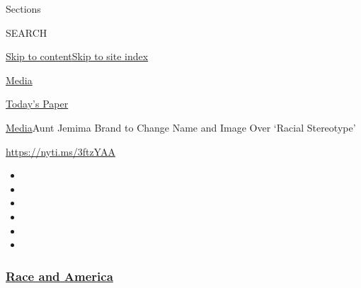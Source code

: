 Sections

SEARCH

\protect\hyperlink{site-content}{Skip to
content}\protect\hyperlink{site-index}{Skip to site index}

\href{https://www.nytimes3xbfgragh.onion/section/business/media}{Media}

\href{https://myaccount.nytimes3xbfgragh.onion/auth/login?response_type=cookie\&client_id=vi}{}

\href{https://www.nytimes3xbfgragh.onion/section/todayspaper}{Today's
Paper}

\href{/section/business/media}{Media}\textbar{}Aunt Jemima Brand to
Change Name and Image Over `Racial Stereotype'

\url{https://nyti.ms/3ftzYAA}

\begin{itemize}
\item
\item
\item
\item
\item
\item
\end{itemize}

\hypertarget{race-and-america}{%
\subsubsection{\texorpdfstring{\href{https://www.nytimes3xbfgragh.onion/news-event/george-floyd-protests-minneapolis-new-york-los-angeles?name=styln-george-floyd\&region=TOP_BANNER\&block=storyline_menu_recirc\&action=click\&pgtype=Article\&impression_id=bcc8d2e0-f1d4-11ea-9a4f-2bebfff0e82c\&variant=undefined}{Race
and America}}{Race and America}}\label{race-and-america}}

